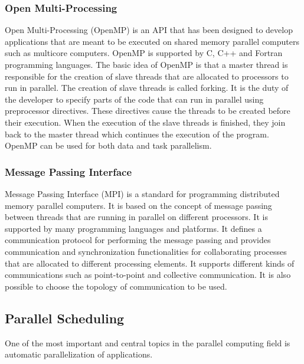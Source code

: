\subsubsection{Open Multi-Processing}
Open Multi-Processing (OpenMP) \cite{openmp} is an API that has been designed to develop applications that are meant to be executed on shared memory parallel computers such as multicore computers. OpenMP is supported by C, C++ and Fortran programming languages. The basic idea of OpenMP is that a master thread is responsible for the creation of slave threads that are allocated to processors to run in parallel. The creation of slave threads is called forking. It is the duty of the developer to specify parts of the code that can run in parallel using preprocessor directives. These directives cause the threads to be created before their execution. When the execution of the slave threads is finished, they join back to the master thread which continues the execution of the program. OpenMP can be used for both data and task parallelism.

\subsubsection{Message Passing Interface}
Message Passing Interface (MPI) \cite{mpi} is a standard for programming distributed memory parallel computers. It is based on the concept of message passing between threads that are running in parallel on different processors. It is supported by many programming languages and platforms. It defines a communication protocol for performing the message passing and provides communication and synchronization functionalities for collaborating processes that are allocated to different processing elements. It supports different kinds of communications such as point-to-point and collective communication. It is also possible to choose the topology of communication to be used.

\subsection{Parallel Scheduling}

One of the most important and central topics in the parallel computing field is automatic parallelization of applications. 


